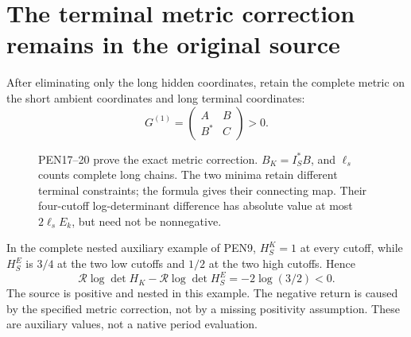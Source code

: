 \documentclass[11pt]{article}
\begin{document}
\section*{The terminal metric correction remains in the original source}
After eliminating only the long hidden coordinates, retain the complete
metric on the short ambient coordinates and long terminal coordinates:
\[
 G^{(1)}=\begin{pmatrix}A&B\\B^*&C\end{pmatrix}>0.
\]
\begin{figure}[H]\centering
{}
\caption{PEN17--20 prove the exact metric correction. $B_K=I_S^*B$,
and $\ell_s$ counts complete long chains. The two minima retain different
terminal constraints; the formula gives their connecting map. Their
four-cutoff log-determinant difference has absolute value at most
$2\ell_sE_k$, but need not be nonnegative.}
\end{figure}
In the complete nested auxiliary example of PEN9,
$H_S^K=1$ at every cutoff, while $H_S^E$ is $3/4$ at the two low
cutoffs and $1/2$ at the two high cutoffs. Hence
\[
 \mathcal R\log\det H_K-\mathcal R\log\det H_S^E
 =-2\log(3/2)<0.
\]
The source is positive and nested in this example. The negative return
is caused by the specified metric correction, not by a missing positivity
assumption. These are auxiliary values, not a native period evaluation.
\clearpage

\clearpage
\end{document}
